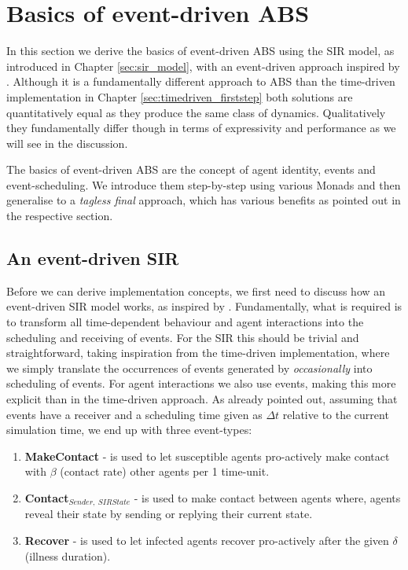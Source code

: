 \section{Basics of event-driven ABS}
\label{sec:eventdriven_basics}

In this section we derive the basics of event-driven ABS using the SIR model, as introduced in Chapter \ref{sec:sir_model}, with an event-driven approach inspired by \cite{macal_agent-based_2010}. Although it is a fundamentally different approach to ABS than the time-driven implementation in Chapter \ref{sec:timedriven_firststep} both solutions are quantitatively equal as they produce the same class of dynamics. Qualitatively they fundamentally differ though in terms of expressivity and performance as we will see in the discussion.

The basics of event-driven ABS are the concept of agent identity, events and event-scheduling. We introduce them step-by-step using various Monads and then generalise to a \textit{tagless final} approach, which has various benefits as pointed out in the respective section. 

\subsection{An event-driven SIR}
Before we can derive implementation concepts, we first need to discuss how an event-driven SIR model works, as inspired by \cite{macal_agent-based_2010}. Fundamentally, what is required is to transform all time-dependent behaviour and agent interactions into the scheduling and receiving of events. For the SIR this should be trivial and straightforward, taking inspiration from the time-driven implementation, where we simply translate the occurrences of events generated by \textit{occasionally} into scheduling of events. For agent interactions we also use events, making this more explicit than in the time-driven approach. As already pointed out, assuming that events have a receiver and a scheduling time given as $\Delta t$ relative to the current simulation time, we end up with three event-types:

\begin{enumerate}
	\item \textbf{MakeContact} - is used to let susceptible agents pro-actively make contact with $\beta$ (contact rate) other agents per 1 time-unit.
	\item \textbf{Contact$_{Sender, \ SIRState}$} - is used to make contact between agents where, agents reveal their state by sending or replying their current state.
	\item \textbf{Recover} - is used to let infected agents recover pro-actively after the given $\delta$ (illness duration). 
\end{enumerate}

